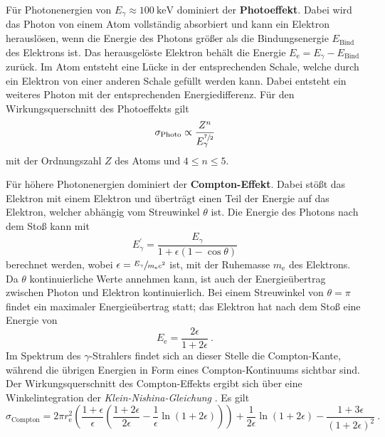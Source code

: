 Für Photonenergien von $E_{\gamma} \approx \SI{100}{\kilo\eV}$ dominiert der \textbf{Photoeffekt}.
Dabei wird das Photon von einem Atom vollständig absorbiert und kann ein Elektron herauslösen,
wenn die Energie des Photons größer als die Bindungsenergie $E_\text{Bind}$ des Elektrons ist.
Das herausgelöste Elektron behält die Energie $E_\text{e} = E_{\gamma} - E_\text{Bind}$ zurück.
Im Atom entsteht eine Lücke in der entsprechenden Schale,
welche durch ein Elektron von einer anderen Schale gefüllt werden kann.
Dabei entsteht ein weiteres Photon mit der entsprechenden Energiedifferenz.
Für den Wirkungsquerschnitt des Photoeffekts gilt
\begin{equation*}
    \sigma_\text{Photo} \propto \frac{Z^n}{E^{\sfrac{7}{2}}_{\gamma}}
\end{equation*}
mit der Ordnungszahl $Z$ des Atoms und $4 \leq n \leq \num{5}$.

Für höhere Photonenergien dominiert der \textbf{Compton-Effekt}.
Dabei stößt das Elektron mit einem Elektron und überträgt einen Teil der Energie auf das Elektron,
welcher abhängig vom Streuwinkel $\theta$ ist.
Die Energie des Photons nach dem Stoß kann mit
\begin{equation*}
    E^{'}_{\gamma} = \frac{E_{\gamma}}{1 + \epsilon(1 - \cos{\theta})}
\end{equation*}
berechnet werden,
wobei $\epsilon = \sfrac{E_{\gamma}}{m_\text{e} c^2}$ ist,
mit der Ruhemasse $m_\text{e}$ des Elektrons.
Da $\theta$ kontinuierliche Werte annehmen kann,
ist auch der Energieübertrag zwischen Photon und Elektron kontinuierlich.
Bei einem Streuwinkel von $\theta = \pi$ findet ein maximaler Energieübertrag statt;
das Elektron hat nach dem Stoß eine Energie von
\begin{equation*}
    E_\text{e} = \frac{2 \epsilon}{1 + 2 \epsilon} \ .
\end{equation*}
Im Spektrum des $\gamma$-Strahlers findet sich an dieser Stelle die Compton-Kante,
während die übrigen Energien in Form eines Compton-Kontinuums sichtbar sind.
Der Wirkungsquerschnitt des Compton-Effekts ergibt sich über eine Winkelintegration der \emph{Klein-Nishina-Gleichung} \cite{knoll}.
Es gilt
\begin{equation}
    \sigma_\text{Compton} =
    2 \pi r^2_\text{e} \left(\frac{1+\epsilon}{\epsilon} \left(\frac{1+2\epsilon}{2\epsilon} - \frac{1}{\epsilon}\ln(1+2\epsilon)\right)\right)
    + \frac{1}{2\epsilon} \ln(1+2\epsilon) - \frac{1+3\epsilon}{(1+2\epsilon)^2} \ .
\end{equation}

